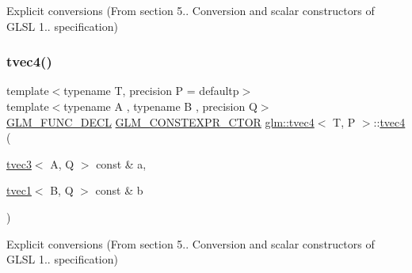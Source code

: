 Explicit conversions (From section 5.. Conversion and scalar constructors of G\+L\+SL 1.. specification) 

\mbox{\label{structglm_1_1tvec4_aff338bbba3d73d36cda06a09a676d934}} 
\subsubsection{\texorpdfstring{tvec4()}{tvec4()}\hspace{0.1cm}{\footnotesize\ttfamily [16/35]}}
{\footnotesize\ttfamily template$<$typename T, precision P = defaultp$>$ \\
template$<$typename A , typename B , precision Q$>$ \\
\mbox{\hyperlink{setup_8hpp_ab2d052de21a70539923e9bcbf6e83a51}{G\+L\+M\+\_\+\+F\+U\+N\+C\+\_\+\+D\+E\+CL}} \mbox{\hyperlink{setup_8hpp_ad34178a09666081abdb573c14d1f4a5a}{G\+L\+M\+\_\+\+C\+O\+N\+S\+T\+E\+X\+P\+R\+\_\+\+C\+T\+OR}} \mbox{\hyperlink{structglm_1_1tvec4}{glm\+::tvec4}}$<$ T, P $>$\+::\mbox{\hyperlink{structglm_1_1tvec4}{tvec4}} (\begin{DoxyParamCaption}\item[{\mbox{\hyperlink{structglm_1_1tvec3}{tvec3}}$<$ A, Q $>$ const \&}]{a,  }\item[{\mbox{\hyperlink{structglm_1_1tvec1}{tvec1}}$<$ B, Q $>$ const \&}]{b }\end{DoxyParamCaption})}



Explicit conversions (From section 5.. Conversion and scalar constructors of G\+L\+SL 1.. specification) 

\mbox{\label{structglm_1_1tvec4_a20fd8534260d3d1a5e8e5b70831bd4f6}} 

